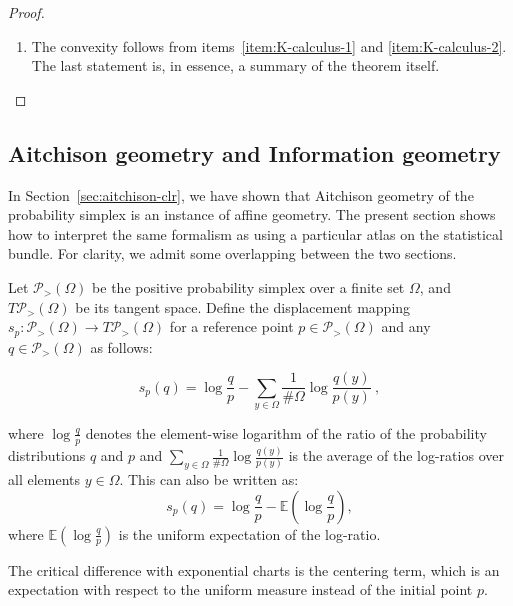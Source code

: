 \documentclass[axioms,article,submit,pdftex,moreauthors]{Definitions/mdpi}
\theoremstyle{plain}
\theoremstyle{remark}
\newcommand{\pdensitieson}[1]{\mathcal P_{>}\left(#1\right)}
\begin{document}
\begin{proof}
\begin{enumerate}
 \item The convexity follows from  items~\ref{item:K-calculus-1} and \ref{item:K-calculus-2}. The last statement is, in essence, a summary of the theorem itself.
\end{enumerate}
\end{proof}

\subsection{Aitchison geometry and Information geometry} 
\label{AG}
In Section~\ref{sec:aitchison-clr}, we have shown that Aitchison geometry of the probability simplex is an instance of affine geometry. The present section shows how to interpret the same formalism as using a particular atlas on the statistical bundle. For clarity, we admit some overlapping between the two sections.

Let $\pdensitieson\Omega$ be the positive probability simplex over a finite set $\Omega$, and $T \pdensitieson\Omega$ be its tangent space. Define the displacement mapping $s_p : \pdensitieson\Omega \to T \pdensitieson\Omega$ for a reference point $p \in \pdensitieson\Omega$ and any $q \in \pdensitieson\Omega$ as follows:

\begin{equation*} 
s_p(q) = \log \frac{q}{p} - \sum_{y \in \Omega} \frac{1}{\#\Omega} \log \frac{q(y)}{p(y)} \ ,
\end{equation*} 

where $\log \frac{q}{p}$ denotes the element-wise logarithm of the ratio of the probability distributions $q$ and $p$ and $\sum_{y \in \Omega} \frac{1}{\#\Omega} \log \frac{q(y)}{p(y)}$ is the average of the log-ratios over all elements $y \in \Omega$. This can also be written as:
\begin{equation} \label{eq:At-displacement}
s_p(q) = \log \frac{q}{p} - \mathbb{E} \left( \log \frac{q}{p} \right),
\end{equation} 
where $\mathbb{E} \left( \log \frac{q}{p} \right)$ is the uniform expectation of the log-ratio.

The critical difference with exponential charts is the centering term, which is an expectation with respect to the uniform measure instead of the initial point $p$.
\end{document}
